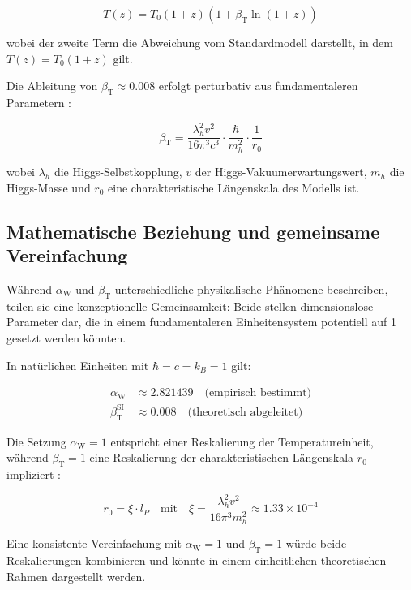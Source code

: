\documentclass[12pt,a4paper]{article}
\newcommand{\betaT}{\beta_{\text{T}}}
\newcommand{\alphaW}{\alpha_{\text{W}}}
\begin{document}
	\begin{equation}
		T(z) = T_0 (1 + z) (1 + \betaT \ln(1 + z))
	\end{equation}
	
	wobei der zweite Term die Abweichung vom Standardmodell darstellt, in dem \(T(z) = T_0 (1 + z)\) gilt.
	
	Die Ableitung von \(\betaT \approx 0.008\) erfolgt perturbativ aus fundamentaleren Parametern \cite{pascher_params_2025}:
	
	\begin{equation}
		\betaT = \frac{\lambda_h^2 v^2}{16\pi^3 c^3} \cdot \frac{\hbar}{m_h^2} \cdot \frac{1}{r_0}
	\end{equation}
	
	wobei \(\lambda_h\) die Higgs-Selbstkopplung, \(v\) der Higgs-Vakuumerwartungswert, \(m_h\) die Higgs-Masse und \(r_0\) eine charakteristische Längenskala des Modells ist.
	
	\subsection{Mathematische Beziehung und gemeinsame Vereinfachung}
	
	Während \(\alphaW\) und \(\betaT\) unterschiedliche physikalische Phänomene beschreiben, teilen sie eine konzeptionelle Gemeinsamkeit: Beide stellen dimensionslose Parameter dar, die in einem fundamentaleren Einheitensystem potentiell auf 1 gesetzt werden könnten.
	
	In natürlichen Einheiten mit \(\hbar = c = k_B = 1\) gilt:
	
	\begin{align}
		\alphaW &\approx 2.821439 \quad \text{(empirisch bestimmt)} \\
		\betaT^{\text{SI}} &\approx 0.008 \quad \text{(theoretisch abgeleitet)}
	\end{align}
	
	Die Setzung \(\alphaW = 1\) entspricht einer Reskalierung der Temperatureinheit, während \(\betaT = 1\) eine Reskalierung der charakteristischen Längenskala \(r_0\) impliziert \cite{pascher_params_2025}:
	
	\begin{equation}
		r_0 = \xi \cdot l_P \quad \text{mit} \quad \xi = \frac{\lambda_h^2 v^2}{16\pi^3 m_h^2} \approx 1.33 \times 10^{-4}
	\end{equation}
	
	Eine konsistente Vereinfachung mit \(\alphaW = 1\) und \(\betaT = 1\) würde beide Reskalierungen kombinieren und könnte in einem einheitlichen theoretischen Rahmen dargestellt werden.
	
\end{document}
